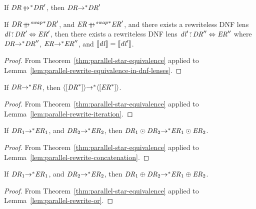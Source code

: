 \documentclass[numbers]{sigplanconf}
\begin{document}
\begin{theorem}
  \label{thm:parallel-star-equivalence}
  If $\DNFRegex \StarOf{\ParallelRewrite} \DNFRegex'$, then $\mathit{DR}
  {\rightarrow}^* \mathit{DR}'$
\end{theorem}

\begin{corollary}
  \label{cor:rewrite-equivalence-in-dnf-lenses}
  If $\DNFRegex \StarOf{\ParallelRewriteSwap} \DNFRegex'$, and $\DNFRegexAlt
  \StarOf{\ParallelRewriteSwap} \DNFRegexAlt'$, and there exists a rewriteless DNF lens
  $\mathit{dl} \,\tilde{:}\, \mathit{DR}' \Leftrightarrow \mathit{ER}'$, then there exists
  a rewriteless DNF lens
  $\mathit{dl}' \,\tilde{:}\, \mathit{DR}'' \Leftrightarrow \mathit{ER}''$ where
  $\mathit{DR} {\rightarrow}^* \mathit{DR}''$, $\mathit{ER} {\rightarrow}^*
  \mathit{ER}''$, and
  $[ \! [\mathit{dl}] \! ] = [ \! [\mathit{dl}'] \! ]$.
\end{corollary}
\begin{proof}
  From Theorem~\ref{thm:parallel-star-equivalence} applied to
  Lemma~\ref{lem:parallel-rewrite-equivalence-in-dnf-lenses}.
\end{proof}

\begin{corollary}
  \label{cor:rewrite-maintained-iteration}
  If $\mathit{DR} {\rightarrow}^* \mathit{ER}$, then
  $\langle[{\mathit{DR}}^*]\rangle {\ensuremath{\rightarrow}}^*
  \langle[{\mathit{ER}}^*]\rangle$.
\end{corollary}
\begin{proof}
  From Theorem~\ref{thm:parallel-star-equivalence} applied to
  Lemma~\ref{lem:parallel-rewrite-iteration}.
\end{proof}

\begin{corollary}
  \label{cor:rewrite-maintained-concat}
  If $\mathit{DR}_1 {\rightarrow}^* \mathit{ER}_1$, and $\mathit{DR}_2
  {\rightarrow}^* \mathit{ER}_2$, then
  $\mathit{DR}_1 \odot \mathit{DR}_2 {\rightarrow}^* \mathit{ER}_1
  \odot \mathit{ER}_2$.
\end{corollary}
\begin{proof}
  From Theorem~\ref{thm:parallel-star-equivalence} applied to
  Lemma~\ref{lem:parallel-rewrite-concatenation}.
\end{proof}

\begin{corollary}
  \label{cor:rewrite-maintained-or}
  If $\mathit{DR}_1 {\rightarrow}^* \mathit{ER}_1$, and $\mathit{DR}_2
  {\rightarrow}^* \mathit{ER}_2$, then
  $\mathit{DR}_1 \oplus \mathit{DR}_2 {\rightarrow}^* \mathit{ER}_1
  \oplus \mathit{ER}_2$.
\end{corollary}
\begin{proof}
  From Theorem~\ref{thm:parallel-star-equivalence} applied to
  Lemma~\ref{lem:parallel-rewrite-or}.
\end{proof}
\end{document}
